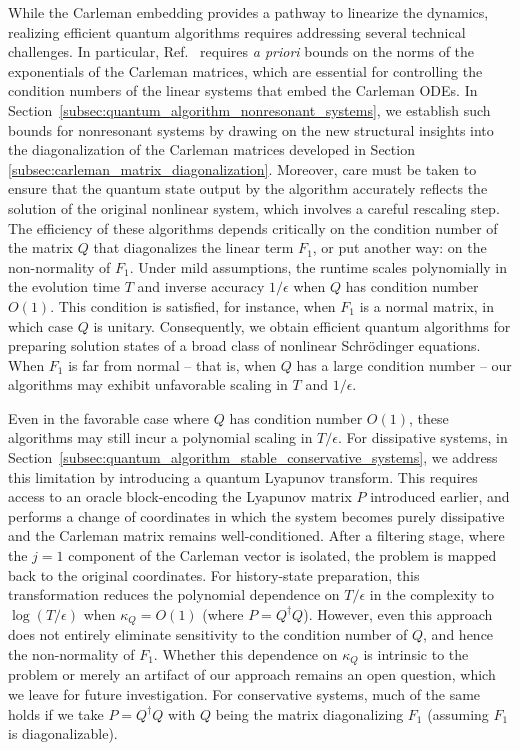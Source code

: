 \documentclass[superscriptaddress,onecolumn,nofootinbib,longbibliography,a4paper,accepted=2026-09-29]{quantumarticle}
\theoremstyle{plain}
\theoremstyle{definition}
\numberwithin{thm}{section}
\numberwithin{assumption}{section}
\numberwithin{lemma}{section}
\numberwithin{prop}{section}
\numberwithin{cor}{section}
\numberwithin{definition}{section}
\numberwithin{rmk}{section}
\numberwithin{equation}{section}
\newcommand{\lrb}[1]{\left ( #1 \right )}
\newcommand{\myO}[1]{O\lrb{#1}}
\begin{document}
While the Carleman embedding provides a pathway to linearize the dynamics, realizing efficient quantum algorithms requires addressing several technical challenges. In particular, Ref.~\cite{jennings2023cost} requires \emph{a priori} bounds on the norms of the exponentials of the Carleman matrices, which are essential for controlling the condition numbers of the linear systems that embed the Carleman ODEs. In Section~\ref{subsec:quantum_algorithm_nonresonant_systems}, we establish such bounds for nonresonant systems
 by drawing on the new structural insights into the diagonalization of the Carleman matrices developed in Section \ref{subsec:carleman_matrix_diagonalization}. Moreover, care must be taken to ensure that the quantum state output by the algorithm accurately reflects the solution of the original nonlinear system, which involves a careful rescaling step. The efficiency of these algorithms depends critically on the condition number of the matrix $Q$ that diagonalizes the linear term $F_1$, or put another way: on the non-normality of $F_1$. Under mild assumptions, the runtime scales polynomially in the evolution time $T$ and inverse accuracy $1/\epsilon$ when $Q$ has condition number $\myO{1}$. This condition is satisfied, for instance, when $F_1$ is a normal matrix, in which case $Q$ is unitary. Consequently, we obtain efficient quantum algorithms for preparing solution states of a broad class of nonlinear Schr\"{o}dinger equations. When $F_1$ is far from normal -- that is, when $Q$ has a large condition number -- our algorithms may exhibit unfavorable scaling in $T$ and $1/\epsilon$. 

Even in the favorable case where $Q$ has condition number $\myO{1}$, these algorithms may still incur a polynomial scaling in $T/\epsilon$. For dissipative systems, in Section~\ref{subsec:quantum_algorithm_stable_conservative_systems}, we address this limitation by introducing a quantum Lyapunov transform. This requires access to an oracle block-encoding the Lyapunov matrix $P$ introduced earlier, and performs a change of coordinates in which the system becomes purely dissipative and the Carleman matrix remains well-conditioned. After a filtering stage, where the $j=1$ component of the Carleman vector is isolated, the problem is mapped back to the original coordinates. For history-state preparation, this transformation reduces the polynomial dependence on $T/\epsilon$ in the complexity to $\log(T/\epsilon)$ when $\kappa_{Q}=\myO{1}$ (where $P = Q^\dag Q$). However, even this approach does not entirely eliminate sensitivity to the condition number of $Q$, and hence the non-normality of $F_1$. Whether this dependence on $\kappa_Q$ is intrinsic to the problem or merely an artifact of our approach remains an open question, which we leave for future investigation. For conservative systems, much of the same holds if we take $P = Q^\dag Q$ with $Q$ being the matrix diagonalizing $F_1$ (assuming $F_1$ is diagonalizable).
\end{document}
